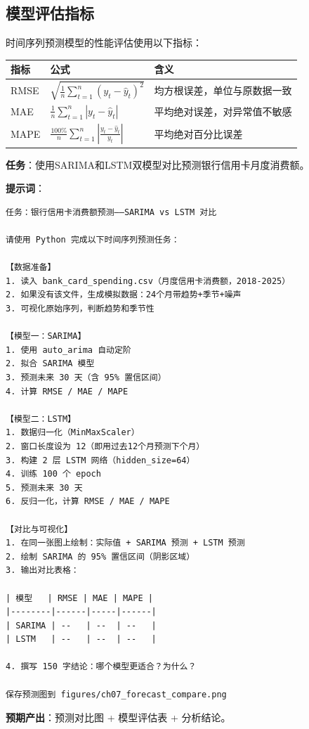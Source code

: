 \subsection{模型评估指标}

时间序列预测模型的性能评估使用以下指标：

\begin{table}[H]
\centering
\begin{tabular}{lll}
\toprule
\textbf{指标} & \textbf{公式} & \textbf{含义} \\
\midrule
RMSE & $\sqrt{\frac{1}{n}\sum_{t=1}^{n}(y_t - \hat{y}_t)^2}$ & 均方根误差，单位与原数据一致 \\
MAE & $\frac{1}{n}\sum_{t=1}^{n}|y_t - \hat{y}_t|$ & 平均绝对误差，对异常值不敏感 \\
MAPE & $\frac{100\%}{n}\sum_{t=1}^{n}\left|\frac{y_t - \hat{y}_t}{y_t}\right|$ & 平均绝对百分比误差 \\
\bottomrule
\end{tabular}
\end{table}

\begin{practicebox}[实操：银行信用卡消费额预测]
\textbf{任务}：使用SARIMA和LSTM双模型对比预测银行信用卡月度消费额。

\textbf{提示词}：

\begin{lstlisting}
任务：银行信用卡消费额预测——SARIMA vs LSTM 对比

请使用 Python 完成以下时间序列预测任务：

【数据准备】
1. 读入 bank_card_spending.csv（月度信用卡消费额，2018-2025）
2. 如果没有该文件，生成模拟数据：24个月带趋势+季节+噪声
3. 可视化原始序列，判断趋势和季节性

【模型一：SARIMA】
1. 使用 auto_arima 自动定阶
2. 拟合 SARIMA 模型
3. 预测未来 30 天（含 95% 置信区间）
4. 计算 RMSE / MAE / MAPE

【模型二：LSTM】
1. 数据归一化（MinMaxScaler）
2. 窗口长度设为 12（即用过去12个月预测下个月）
3. 构建 2 层 LSTM 网络（hidden_size=64）
4. 训练 100 个 epoch
5. 预测未来 30 天
6. 反归一化，计算 RMSE / MAE / MAPE

【对比与可视化】
1. 在同一张图上绘制：实际值 + SARIMA 预测 + LSTM 预测
2. 绘制 SARIMA 的 95% 置信区间（阴影区域）
3. 输出对比表格：

| 模型   | RMSE | MAE | MAPE |
|--------|------|-----|------|
| SARIMA | --   | --  | --   |
| LSTM   | --   | --  | --   |

4. 撰写 150 字结论：哪个模型更适合？为什么？

保存预测图到 figures/ch07_forecast_compare.png
\end{lstlisting}

\textbf{预期产出}：预测对比图 + 模型评估表 + 分析结论。
\end{practicebox}

